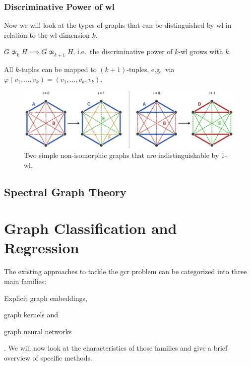 \subsubsection{Discriminative Power of \acs{wl}}
Now we will look at the types of graphs that can be distinguished by \acs{wl} in relation to the \acs{wl}-dimension $k$.
\begin{thm}
	$G \mathrel{\not\simeq_k} H \implies G \mathrel{\not\simeq_{k+1}} H$, i.e.\ the discriminative power of $k$-\acs{wl} grows with $k$.
	\begin{hproof}
		All $k$-tuples can be mapped to $(k+1)$-tuples, e.g.\ via $\varphi(v_1, \dots, v_k) = (v_1, \dots, v_k, v_k)$.
	\end{hproof}
\end{thm}
\begin{figure}[ht]
	\centering
	\includegraphics[width=\linewidth]{gfx/related-work/wl2-problem-solution.pdf}
	\caption[Two simple non-isomorphic graphs that are indistinguishable by 1-\acs{wl}.]{
		Two simple non-isomorphic graphs that are indistinguishable by 1-\acs{wl}.
	}\label{fig:related:wl2-problem-solution}
\end{figure}

\subsection{Spectral Graph Theory}%
\label{sec:related:character:spectral}

\section{Graph Classification and Regression}%
\label{sec:related:gcr}

The existing approaches to tackle the \ac{gcr} problem can be categorized into three main families:
\begin{enumerate*}
	\item Explicit graph embeddings,
	\item graph kernels and
	\item graph neural networks
\end{enumerate*}.
We will now look at the characteristics of those families and give a brief overview of specific methods.


